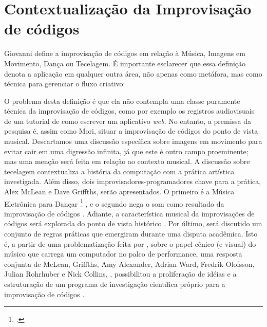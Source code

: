 \chapter{Contextualização da Improvisação de códigos}\label{cap:introducao}

Giovanni  define a improvisação de códigos em relação à Música, Imagens em Movimento, Dança ou Tecelagem. É importante esclarecer que essa definição denota a aplicação em qualquer outra área, não apenas como metáfora, mas como técnica para gerenciar o fluxo criativo:

\begin{citacao}
\end{citacao}

O problema desta definição é que ela não contempla uma classe puramente técnica da improvisação de códigos, como por exemplo os registros audiovisuais de um tutorial de como escrever um aplicativo \emph{web}. No entanto, a premissa da pesquisa é, assim como Mori, situar a improvisação de códigos do ponto de vista musical. Descartamos uma discussão específica sobre imagens em movimento para evitar cair em uma digressão infinita, já que este é outro campo proeminente; mas uma menção será feita em relação ao contexto musical. A discussão sobre tecelagem  contextualiza a história da computação com a prática artística investigada. Além disso, dois improvisadores-programadores chave para a prática, Alex McLean e Dave Griffths, serão apresentados. O primeiro é a Música Eletrônica para Dançar \footnote{.} , e o segundo nega o som como resultado da improvisação de códigos . Adiante, a característica musical da improvisações de códigos será explorada do ponto de vista histórico . Por último, será discutido um conjunto de regras práticas que emergiram durante uma disputa acadêmica. Isto é, a partir de uma problematização feita por , sobre o papel cênico (e visual) do músico que carrega um computador no palco de performance, uma resposta conjunta de McLean, Griffths, Amy Alexander, Adrian Ward, Fredrik Olofsson, Julian Rohrhuber e Nick Collins, \cite{ward_live_2004}, possibilitou a proliferação de idéias e a estruturação de um programa de investigação científica próprio para a improvisação de códigos .

